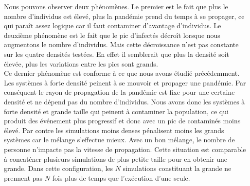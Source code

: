 Nous pouvons observer deux phénomènes. Le premier est le fait que plus le nombre d'individus est élevé, plus la pandémie prend du temps à se propager, ce qui paraît assez logique car il faut contaminer d'avantage d'individus. Le deuxième phénomène est le fait que le pic d'infectés décroît lorsque nous augmentons le nombre d'individus. Mais cette décroissance n'est pas constante sur les quatre densités testées. En effet il semblerait que plus la densité soit élevée, plus les variations entre les pics sont grands.\\

Ce dernier phénomène est conforme à ce que nous avons étudié précédemment. Les systèmes à forte densité peinent à se mouvoir et propager une pandémie. Par conséquent le rayon de propagation de la pandémie est fixe pour une certaine densité et ne dépend pas du nombre d'individus. Nous avons donc les systèmes à forte densité et grande taille qui peinent à contaminer la population, ce qui produit des événement plus progressif et donc avec un pic de contaminés moins élevé. Par contre les simulations moins denses pénalisent moins les grands systèmes car le mélange s'effectue mieux. Avec un bon mélange, le nombre de personne n'impacte pas la vitesse de propagation. Cette situation est comparable à concaténer plusieurs simulations de plus petite taille pour en obtenir une grande. Dans cette configuration, les $N$ simulations constituant la grande ne prennent pas $N$ fois plus de temps que l'exécution d'une seule.

